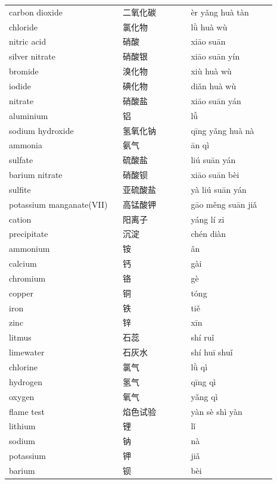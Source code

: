 \documentclass[11pt]{article}
\begin{document}
\begin{longtable}{@{}p{0.40\linewidth}p{0.24\linewidth}p{0.30\linewidth}@{}}
carbon dioxide & 二氧化碳 & èr yǎng huà tàn \\
chloride & 氯化物 & lǜ huà wù \\
nitric acid & 硝酸 & xiāo suān \\
silver nitrate & 硝酸银 & xiāo suān yín \\
bromide & 溴化物 & xiù huà wù \\
iodide & 碘化物 & diǎn huà wù \\
nitrate & 硝酸盐 & xiāo suān yán \\
aluminium & 铝 & lǚ \\
sodium hydroxide & 氢氧化钠 & qīng yǎng huà nà \\
ammonia & 氨气 & ān qì \\
sulfate & 硫酸盐 & liú suān yán \\
barium nitrate & 硝酸钡 & xiāo suān bèi \\
sulfite & 亚硫酸盐 & yà liú suān yán \\
potassium manganate(VII) & 高锰酸钾 & gāo měng suān jiǎ \\
cation & 阳离子 & yáng lí zi \\
precipitate & 沉淀 & chén diàn \\
ammonium & 铵 & ǎn \\
calcium & 钙 & gài \\
chromium & 铬 & gè \\
copper & 铜 & tóng \\
iron & 铁 & tiě \\
zinc & 锌 & xīn \\
litmus & 石蕊 & shí ruǐ \\
limewater & 石灰水 & shí huī shuǐ \\
chlorine & 氯气 & lǜ qì \\
hydrogen & 氢气 & qīng qì \\
oxygen & 氧气 & yǎng qì \\
flame test & 焰色试验 & yàn sè shì yàn \\
lithium & 锂 & lǐ \\
sodium & 钠 & nà \\
potassium & 钾 & jiǎ \\
barium & 钡 & bèi \\
\end{longtable}
\end{document}
